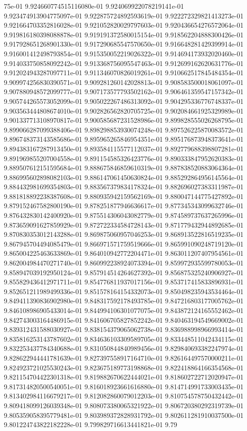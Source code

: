 75e-01	9.924660774515116080e-01	9.924069922078219141e-01	9.923474913904775097e-01	9.922875724892593619e-01	9.922272329821413273e-01	9.921664703352816028e-01	9.921052820029797603e-01	9.920436654276572064e-01	9.919816180398088878e-01	9.919191372580015154e-01	9.918562204888300426e-01	9.917928651268901330e-01	9.917290685547570650e-01	9.916648281429399914e-01	9.916001412498793854e-01	9.915350052219026322e-01	9.914694173932020460e-01	9.914033750858092242e-01	9.913368756095547463e-01	9.912699162620631776e-01	9.912024943287097711e-01	9.911346070826019261e-01	9.910662517845484354e-01	9.909974256830390571e-01	9.909281260142028813e-01	9.908583500018061097e-01	9.907880948572099777e-01	9.907173577793502162e-01	9.906461359547157342e-01	9.905744265573052099e-01	9.905022267486313092e-01	9.904295336776748337e-01	9.903563444808674010e-01	9.902826562820705725e-01	9.902084661925329989e-01	9.901337713108970817e-01	9.900585687231528986e-01	9.899828555026268795e-01	9.899066287099388406e-01	9.898298853930074248e-01	9.897526225870083572e-01	9.896748373143585686e-01	9.895965265846954351e-01	9.895176873948373641e-01	9.894383167287913450e-01	9.893584115577112037e-01	9.892779688398807281e-01	9.891969855207004558e-01	9.891154585326423776e-01	9.890333847952620383e-01	9.889507612151595684e-01	9.888675846859610319e-01	9.887838520883064364e-01	9.886995602898082103e-01	9.886147061450630824e-01	9.885292864956145564e-01	9.884432981699354803e-01	9.883567379834178324e-01	9.882696027383311987e-01	9.881818892238387608e-01	9.880935942159562169e-01	9.880047144775427892e-01	9.879152467582800190e-01	9.878251877946636617e-01	9.877345343099632746e-01	9.876432830142400920e-01	9.875514306043082779e-01	9.874589737637265996e-01	9.873659091627859929e-01	9.872722334584728143e-01	9.871779432944892685e-01	9.870830353012143288e-01	9.869875060957046253e-01	9.868913522816519235e-01	9.867945704494085479e-01	9.866971571759519666e-01	9.865991090248719120e-01	9.865004225463633869e-01	9.864010942772204471e-01	9.863011207407954561e-01	9.862004984470271740e-01	9.860992238924073394e-01	9.859972935599780053e-01	9.858947039192950124e-01	9.857914514264627392e-01	9.856875325240906927e-01	9.855829436412971711e-01	9.854776811937017156e-01	9.853717415833896931e-01	9.852651211989499336e-01	9.851578164154332073e-01	9.850498235943534464e-01	9.849411390836902980e-01	9.848317592178493785e-01	9.847216803177005762e-01	9.846108986905433014e-01	9.844994106301077075e-01	9.843872124165552462e-01	9.842743003164486915e-01	9.841606705827852242e-01	9.840463194549669002e-01	9.839312431588030927e-01	9.838154379065062738e-01	9.836988998966993414e-01	9.835816253143787602e-01	9.834636103309589705e-01	9.833448511042434115e-01	9.832253437784340688e-01	9.831050844840989456e-01	9.829840693382247974e-01	9.828622944441781639e-01	9.827397558917164710e-01	9.826164497570000211e-01	9.824923721025530243e-01	9.823675189773198868e-01	9.822418864166354568e-01	9.821154704422301318e-01	9.819882670622444021e-01	9.818602722712020947e-01	9.817314820500540051e-01	9.816018923661616880e-01	9.814714991733003435e-01	9.813402984116679217e-01	9.812082860079012203e-01	9.810754578750432442e-01	9.809418099126039348e-01	9.808073380065321922e-01	9.806720380292319739e-01	9.805359058395779481e-01	9.803989372828931792e-01	9.802611281910037500e-01	9.801224743822182228e-01	9.799829716613441821e-01	9.79